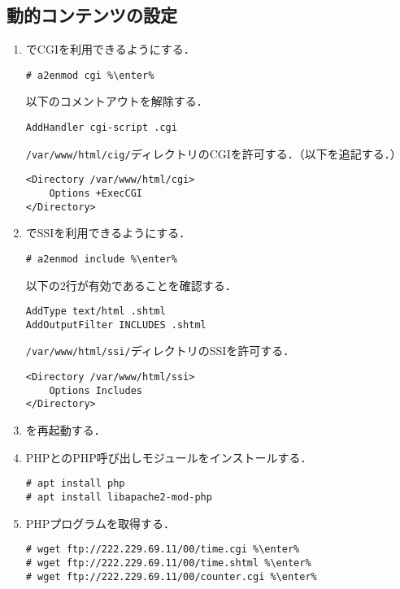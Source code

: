 \documentclass{jlreq}
\begin{document}
\subsection{動的コンテンツの設定}
\begin{enumerate}
    \item \apache でCGIを利用できるようにする．
          \begin{lstlisting}
# a2enmod cgi %\enter%
\end{lstlisting}
          以下のコメントアウトを解除する．
          \begin{lstlisting}[style=file,caption={\ttfamily /etc/apache2/mods-enabled/mime.conf}]
AddHandler cgi-script .cgi
\end{lstlisting}
          \texttt{/var/www/html/cig/}ディレクトリのCGIを許可する．（以下を追記する．）
          \begin{lstlisting}[style=file,caption={\ttfamily /etc/apache2/sites-available/default-ssl.conf}]
<Directory /var/www/html/cgi>
    Options +ExecCGI
</Directory>
\end{lstlisting}
    \item \apache でSSIを利用できるようにする．
          \begin{lstlisting}
# a2enmod include %\enter%
\end{lstlisting}
          以下の2行が有効であることを確認する．
          \begin{lstlisting}[style=file,caption={\ttfamily /etc/apache2/mods-enabled/mime.conf}]
AddType text/html .shtml
AddOutputFilter INCLUDES .shtml
\end{lstlisting}
          \texttt{/var/www/html/ssi/}ディレクトリのSSIを許可する．
          \begin{lstlisting}[style=file,caption={\ttfamily /etc/apache2/sites-available/default-ssl.conf}]
<Directory /var/www/html/ssi>
    Options Includes
</Directory>
\end{lstlisting}
    \item \apache を再起動する．
    \item PHPと\apache のPHP呼び出しモジュールをインストールする．
          \begin{lstlisting}
# apt install php
# apt install libapache2-mod-php
\end{lstlisting}
    \item PHPプログラムを取得する．
          \begin{lstlisting}
# wget ftp://222.229.69.11/00/time.cgi %\enter%
# wget ftp://222.229.69.11/00/time.shtml %\enter%
# wget ftp://222.229.69.11/00/counter.cgi %\enter%

\end{lstlisting}
\end{enumerate}
\end{document}
